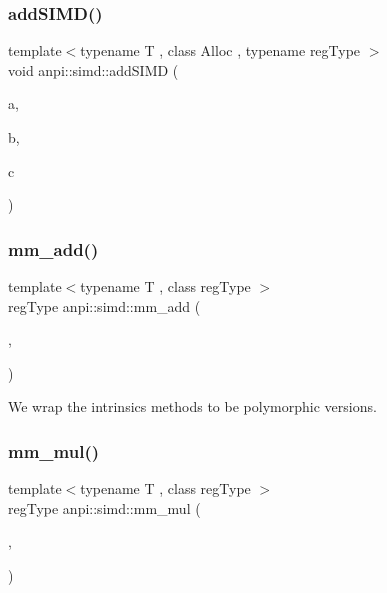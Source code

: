 \subsubsection{\texorpdfstring{add\+S\+I\+M\+D()}{addSIMD()}}
{\footnotesize\ttfamily template$<$typename T , class Alloc , typename reg\+Type $>$ \\
void anpi\+::simd\+::add\+S\+I\+MD (\begin{DoxyParamCaption}\item[{const \hyperlink{classanpi_1_1Matrix}{Matrix}$<$ T, Alloc $>$ \&}]{a,  }\item[{const \hyperlink{classanpi_1_1Matrix}{Matrix}$<$ T, Alloc $>$ \&}]{b,  }\item[{\hyperlink{classanpi_1_1Matrix}{Matrix}$<$ T, Alloc $>$ \&}]{c }\end{DoxyParamCaption})\hspace{0.3cm}{\ttfamily [inline]}}

\mbox{\label{namespaceanpi_1_1simd_a806b5ccd28c228e97b86cc94662c73b1}} 
\subsubsection{\texorpdfstring{mm\+\_\+add()}{mm\_add()}}
{\footnotesize\ttfamily template$<$typename T , class reg\+Type $>$ \\
reg\+Type anpi\+::simd\+::mm\+\_\+add (\begin{DoxyParamCaption}\item[{reg\+Type}]{,  }\item[{reg\+Type}]{ }\end{DoxyParamCaption})}



We wrap the intrinsics methods to be polymorphic versions. 

\mbox{\label{namespaceanpi_1_1simd_aa7ebdb38c8e4fc5fa991bba556974de5}} 
\subsubsection{\texorpdfstring{mm\+\_\+mul()}{mm\_mul()}}
{\footnotesize\ttfamily template$<$typename T , class reg\+Type $>$ \\
reg\+Type anpi\+::simd\+::mm\+\_\+mul (\begin{DoxyParamCaption}\item[{reg\+Type}]{,  }\item[{reg\+Type}]{ }\end{DoxyParamCaption})}

